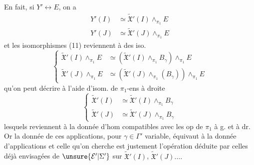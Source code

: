 En fait, si $Y'\longleftrightarrow E$, on a
\[
\begin{aligned}
Y'(I)&\simeq\widetilde{\mathfrak X}'(I)\mathbin{\wedge}_{\pi_1}E\\
Y'(J)&\simeq\widetilde{\mathfrak X}'(J)\mathbin{\wedge}_{\pi_1}E
\end{aligned}
\]
et les  isomorphismes (11) reviennent à des iso.
\[
\left\{\begin{aligned}
\widetilde{\mathfrak X}'(I)\mathbin{\wedge}_{\pi_1}E&\simeq(\widetilde{\mathfrak X}'(I)\mathbin{\wedge}_{\pi_1}B_\gamma)\mathbin{\wedge}_{\pi_1}E\\
\widetilde{\mathfrak X}'(J)\mathbin{\wedge}_{\pi_1}E&\simeq(\widetilde{\mathfrak X}'(J)\mathbin{\wedge}_{\pi_1}(B_\gamma))\mathbin{\wedge}_{\pi_1}E
\end{aligned}\right.
\]
qu'on peut décrire à l'aide d'isom. de $\pi_1$-ens à droite
\[
\left\{\begin{aligned}
\widetilde{\mathfrak X}'(I)&\simeq\widetilde{\mathfrak X}'(I)\mathbin{\wedge}_{\pi_1}B_\gamma\\
\widetilde{\mathfrak X}'(J)&\simeq\widetilde{\mathfrak X}'(J)\mathbin{\wedge}_{\pi_1}B_\gamma
\end{aligned}\right.
\]
lesquels reviennent à la donnée d'hom
compatibles avec les op de $\pi_1$ à g. et à dr.
Or la donnée de ces applications, pour $\gamma\in\Gamma'$ variable, équivaut  à la donnée d'applications
et celle qu'on cherche est justement l'opération déduite par celles déjà envisagées de $\unsure{\mathcal E'|\Sigma'}$ sur $\widetilde{\mathfrak X}'(I)$, $\widetilde{\mathfrak X}'(J)\ldots.$


